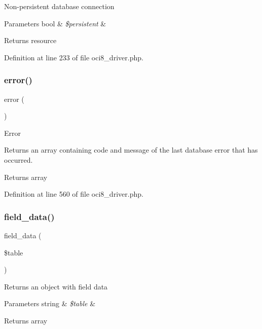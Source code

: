 Non-\/persistent database connection


\begin{DoxyParams}[1]{Parameters}
bool & {\em \$persistent} & \\
\hline
\end{DoxyParams}
\begin{DoxyReturn}{Returns}
resource 
\end{DoxyReturn}


Definition at line 233 of file oci8\+\_\+driver.\+php.

\mbox{\label{class_c_i___d_b__oci8__driver_a43b8d30b879d4f09ceb059b02af2bc02}} 
\subsubsection{\texorpdfstring{error()}{error()}}
{\footnotesize\ttfamily error (\begin{DoxyParamCaption}{ }\end{DoxyParamCaption})}

Error

Returns an array containing code and message of the last database error that has occurred.

\begin{DoxyReturn}{Returns}
array 
\end{DoxyReturn}


Definition at line 560 of file oci8\+\_\+driver.\+php.

\mbox{\label{class_c_i___d_b__oci8__driver_a90355121e1ed009e0efdbd544ab56efa}} 
\subsubsection{\texorpdfstring{field\_data()}{field\_data()}}
{\footnotesize\ttfamily field\+\_\+data (\begin{DoxyParamCaption}\item[{}]{\$table }\end{DoxyParamCaption})}

Returns an object with field data


\begin{DoxyParams}[1]{Parameters}
string & {\em \$table} & \\
\hline
\end{DoxyParams}
\begin{DoxyReturn}{Returns}
array 
\end{DoxyReturn}


